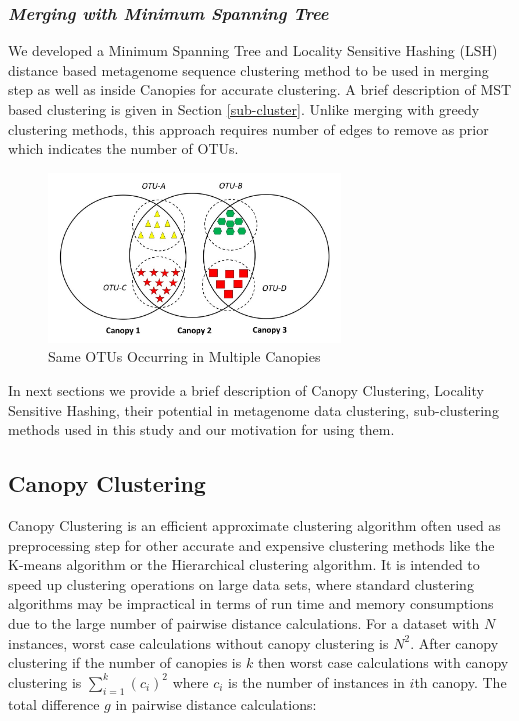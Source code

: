 \documentclass[10pt, conference, compsocconf]{IEEEtran}
\begin{document}
\subsubsection{\textit{Merging with Minimum Spanning Tree}}
\label{MST}
We developed a Minimum Spanning Tree and Locality Sensitive Hashing (LSH) distance based metagenome sequence clustering method to be used in merging step as well as inside Canopies for accurate clustering. A brief description of MST based clustering is given in Section \ref{sub-cluster}. Unlike merging with greedy clustering methods, this approach requires number of edges to remove as prior which indicates the number of OTUs.    

\begin{figure}
	\centering
	\includegraphics[width=\linewidth,height=4.5cm]{merge.jpg}	
	\caption{Same OTUs Occurring in Multiple Canopies}
	\label{fig:merge}
\end{figure}  

In next sections we provide a brief description of Canopy Clustering, Locality Sensitive Hashing, their potential in metagenome data clustering, sub-clustering methods used in this study and our motivation for using them.  

\subsection{\textbf{Canopy Clustering}}

Canopy Clustering \cite{MARCanopy} is an efficient approximate clustering algorithm often used as preprocessing step for other accurate and expensive clustering methods like the K-means algorithm or the Hierarchical clustering algorithm. It is intended to speed up clustering operations on large data sets, where standard clustering algorithms may be impractical in terms of run time and memory consumptions due to the large number of pairwise distance calculations. For a dataset with $N$ instances, worst case calculations without canopy clustering is $N^2$. After canopy clustering if the number of canopies is $k$ then worst case calculations with canopy clustering is $\sum_{i=1}^{k}(c_i)^2$ where $c_i$ is the number of instances in $i$th canopy. The total difference $g$ in pairwise distance calculations:
\end{document}
